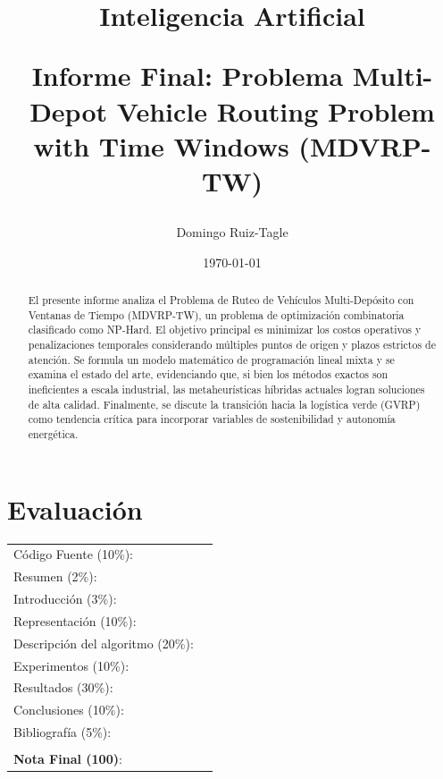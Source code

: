 \documentclass[letter, 10pt]{article}
\begin{document}
\title{Inteligencia Artificial \\ \begin{Large}Informe Final: Problema Multi-Depot Vehicle Routing Problem with Time Windows (MDVRP-TW)\end{Large}}
\author{Domingo Ruiz-Tagle}
\date{\today}
\maketitle

\section*{Evaluaci\'on}
\begin{tabular}{ll}
C\'odigo Fuente (10\%): & \underline{\hspace{2cm}}\\
Resumen (2\%): & \underline{\hspace{2cm}} \\
Introducci\'on (3\%): & \underline{\hspace{2cm}} \\
Representaci\'on (10\%): & \underline{\hspace{2cm}} \\
Descripci\'on del algoritmo (20\%): & \underline{\hspace{2cm}} \\
Experimentos (10\%): & \underline{\hspace{2cm}} \\
Resultados (30\%): & \underline{\hspace{2cm}} \\
Conclusiones (10\%): & \underline{\hspace{2cm}}\\
Bibliograf\'ia (5\%): & \underline{\hspace{2cm}}\\
& \\
\textbf{Nota Final (100)}: & \underline{\hspace{2cm}}
\end{tabular}

\vspace{2cm}

\begin{abstract}
El presente informe analiza el Problema de Ruteo de Veh\'iculos Multi-Dep\'osito con Ventanas de Tiempo (MDVRP-TW), un problema de optimizaci\'on combinatoria clasificado como NP-Hard. El objetivo principal es minimizar los costos operativos y penalizaciones temporales considerando m\'ultiples puntos de origen y plazos estrictos de atenci\'on. Se formula un modelo matem\'atico de programaci\'on lineal mixta y se examina el estado del arte, evidenciando que, si bien los m\'etodos exactos son ineficientes a escala industrial, las metaheur\'isticas h\'ibridas actuales logran soluciones de alta calidad. Finalmente, se discute la transici\'on hacia la log\'istica verde (GVRP) como tendencia cr\'itica para incorporar variables de sostenibilidad y autonom\'ia energ\'etica.
\end{abstract}
\end{document}
